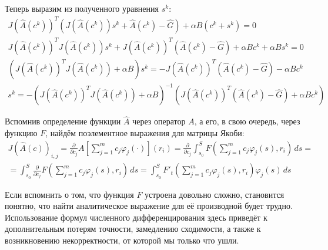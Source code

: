\documentclass[a4paper,14pt]{extarticle}
\begin{document}
    Теперь выразим из полученного уравнения $s^k$:
    \begin{gather*}
        J(\hat{A}(c^k))^T (J(\hat{A}(c^k))s^{k} + \hat{A}(c^k) - \hat{G})
        + \alpha  B (c^k + s^{k}) = 0 \\
        J(\hat{A}(c^k))^T J(\hat{A}(c^k))s^{k} +
        J(\hat{A}(c^k))^T (\hat{A}(c^k) - \hat{G})
        + \alpha  B c^k +
        \alpha  B s^{k} = 0 \\
        \left(
        J(\hat{A}(c^k))^T J(\hat{A}(c^k))
        + \alpha  B
        \right) s^{k} =
        -J(\hat{A}(c^k))^T (\hat{A}(c^k) - \hat{G})
        - \alpha  B c^k  \\
        s^{k} = -
        \left(
        J(\hat{A}(c^k))^T J(\hat{A}(c^k))
        + \alpha  B
        \right)^{-1}
        \left(
        J(\hat{A}(c^k))^T (\hat{A}(c^k) - \hat{G})
        + \alpha  B c^k
        \right)
    \end{gather*}

    Вспомнив определение функции $\hat{A}$ через оператор $A$, а его, в свою очередь, через функцию $F$, найдём поэлементное выражения для матрицы Якоби:
    \begin{gather*}
        J(\hat{A}(c))_{i, j}
        = \frac{\partial}{\partial c_j}
        A\left[
            \sum_{j = 1}^m c_j \varphi_j(\cdot)
            \right] (r_i)
        = \frac{\partial}{\partial c_j} \int_{s_0}^{S}
        F
        \left(
        \sum_{j = 1}^m c_j \varphi_j(s)
        , r_i
        \right) \, ds = \\
        = \int_{s_0}^{S}
        \frac{\partial}{\partial c_j}
        F
        \left(
        \sum_{j = 1}^m c_j \varphi_j(s)
        , r_i
        \right) \, ds
        = \int_{s_0}^{S}
        F'_t
        \left(
        \sum_{j = 1}^m c_j \varphi_j(s)
        , r_i
        \right)
        \varphi_j(s)
        \, ds
    \end{gather*}

    Если вспомнить о том, что функция $F$ устроена довольно сложно, становится понятно, что найти аналитическое выражение для её производной будет трудно. Использование формул численного дифференцирования здесь приведёт к дополнительным потерям точности, замедлению сходимости, а также к возникновению некорректности, от которой мы только что ушли.
\end{document}
